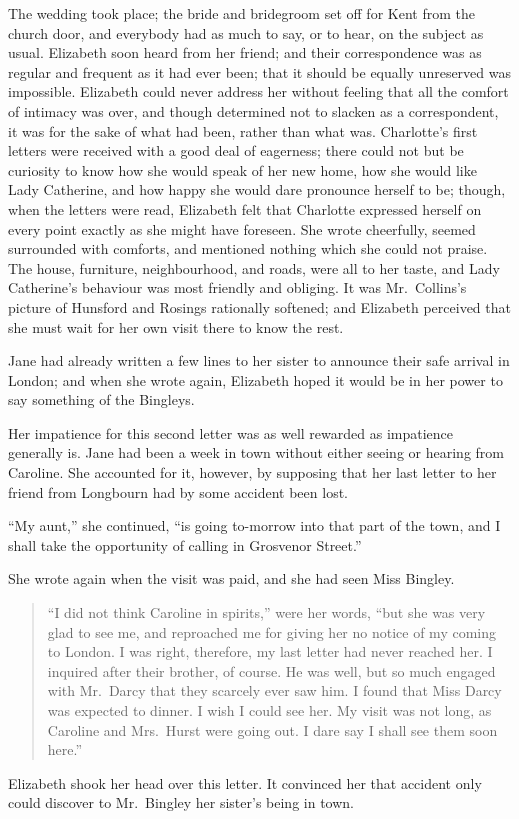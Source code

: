 \documentclass[12pt,english,oneside]{book}
\begin{document}
The wedding took place; the bride and bridegroom set off for Kent
from the church door, and everybody had as much to say, or to hear,
on the subject as usual. Elizabeth soon heard from her friend; and
their correspondence was as regular and frequent as it had ever been;
that it should be equally unreserved was impossible. Elizabeth could
never address her without feeling that all the comfort of intimacy
was over, and though determined not to slacken as a correspondent,
it was for the sake of what had been, rather than what was. Charlotte's
first letters were received with a good deal of eagerness; there could
not but be curiosity to know how she would speak of her new home,
how she would like Lady Catherine, and how happy she would dare pronounce
herself to be; though, when the letters were read, Elizabeth felt
that Charlotte expressed herself on every point exactly as she might
have foreseen. She wrote cheerfully, seemed surrounded with comforts,
and mentioned nothing which she could not praise. The house, furniture,
neighbourhood, and roads, were all to her taste, and Lady Catherine's
behaviour was most friendly and obliging. It was Mr.\ Collins's picture
of Hunsford and Rosings rationally softened; and Elizabeth perceived
that she must wait for her own visit there to know the rest.

Jane had already written a few lines to her sister to announce their
safe arrival in London; and when she wrote again, Elizabeth hoped
it would be in her power to say something of the Bingleys.

Her impatience for this second letter was as well rewarded as impatience
generally is. Jane had been a week in town without either seeing or
hearing from Caroline. She accounted for it, however, by supposing
that her last letter to her friend from Longbourn had by some accident
been lost.

{}``My aunt,'' she continued, {}``is going to-morrow into that
part of the town, and I shall take the opportunity of calling in Grosvenor
Street.''

She wrote again when the visit was paid, and she had seen Miss Bingley. 

\begin{quote}
{}``I did not think Caroline in spirits,'' were her words, {}``but
she was very glad to see me, and reproached me for giving her no notice
of my coming to London. I was right, therefore, my last letter had
never reached her. I inquired after their brother, of course. He was
well, but so much engaged with Mr.\ Darcy that they scarcely ever
saw him. I found that Miss Darcy was expected to dinner. I wish I
could see her. My visit was not long, as Caroline and Mrs.\ Hurst
were going out. I dare say I shall see them soon here.''
\end{quote}
Elizabeth shook her head over this letter. It convinced her that accident
only could discover to Mr.\ Bingley her sister's being in town.
\end{document}
